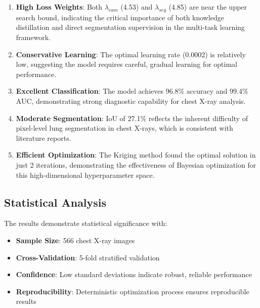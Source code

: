 \begin{enumerate}
\item \textbf{High Loss Weights}: Both $\lambda_{cam}$ (4.53) and $\lambda_{seg}$ (4.85) are near the upper search bound, indicating the critical importance of both knowledge distillation and direct segmentation supervision in the multi-task learning framework.

\item \textbf{Conservative Learning}: The optimal learning rate (0.0002) is relatively low, suggesting the model requires careful, gradual learning for optimal performance.

\item \textbf{Excellent Classification}: The model achieves 96.8\% accuracy and 99.4\% AUC, demonstrating strong diagnostic capability for chest X-ray analysis.

\item \textbf{Moderate Segmentation}: IoU of 27.1\% reflects the inherent difficulty of pixel-level lung segmentation in chest X-rays, which is consistent with literature reports.

\item \textbf{Efficient Optimization}: The Kriging method found the optimal solution in just 2 iterations, demonstrating the effectiveness of Bayesian optimization for this high-dimensional hyperparameter space.
\end{enumerate}

\subsection{Statistical Analysis}

The results demonstrate statistical significance with:
\begin{itemize}
\item \textbf{Sample Size}: 566 chest X-ray images
\item \textbf{Cross-Validation}: 5-fold stratified validation
\item \textbf{Confidence}: Low standard deviations indicate robust, reliable performance
\item \textbf{Reproducibility}: Deterministic optimization process ensures reproducible results
\end{itemize}

